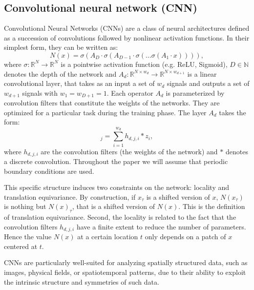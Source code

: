 \documentclass[a4paper,10pt]{article}
\theoremstyle{definition} %
\theoremstyle{definition} %
\theoremstyle{definition} %
\theoremstyle{definition} %
\newcommand{\R}{\mathbb{R}}
\newcommand{\N}{\mathbb{N}}
\newcommand{\0}{\boldsymbol{0}}
\begin{document}
\subsection{Convolutional neural network (CNN)}
Convolutional Neural Networks (CNNs) are a class of neural architectures defined as a succession of convolutions followed by nonlinear activation functions. 
In their simplest form, they can be written as:
\begin{equation*}
    N(x)  = \sigma\left( A_D \cdot \sigma \left( A_{D-1} \cdot \sigma \left( \hdots \sigma\left( A_1 \cdot x \right)\right)\right)\right),
\end{equation*}
where $\sigma: \R^N\to \R^N$ is a pointwise activation function (e.g. ReLU,  Sigmoid), $D\in \N$ denotes the depth of the network and $A_d : \R^{N\times w_d}\to \R^{N\times w_{d+1}}$ is a linear convolutional layer, that takes as an input a set of $w_d$ signals and outputs a set of $w_{d+1}$ signals with $w_1=w_{D+1} = 1$. Each operator $A_d$ is parameterized by convolution filters that constitute the weights of the networks. 
They are optimized for a particular task during the training phase. 
The layer $A_d$ takes the form:
\begin{equation}
    [A_d \cdot \{z_1,\hdots, z_{w_d}\}]_{j} = \sum_{i=1}^{w_d} h_{d,j,i} * z_i, 
\end{equation}
where $h_{d,j,i}$ are the convolution filters (the weights of the network) and $*$ denotes a discrete convolution. Throughout the paper we will assume that periodic boundary conditions are used. 

This specific structure induces two constraints on the network: locality and translation equivariance. 
By construction, if $x_\tau$ is a shifted version of $x$, $N(x_\tau)$ is nothing but $N(x)_{\tau}$, that is a shifted version of $N(x)$. 
This is the definition of translation equivariance.
Second, the locality is related to the fact that the convolution filters $h_{d,j,i}$ have a finite extent to reduce the number of parameters. 
Hence the value $N(x)$ at a certain location $t$ only depends on a patch of $x$ centered at $t$. 

CNNs are particularly well-suited for analyzing spatially structured data, such as images, physical fields, or spatiotemporal patterns, due to their ability to exploit the intrinsic structure and symmetries of such data. 
\end{document}
